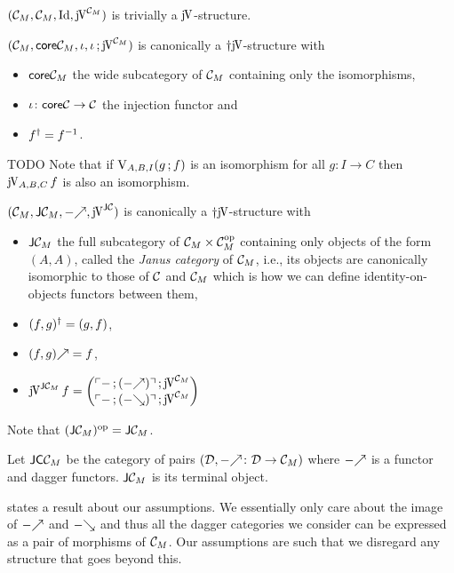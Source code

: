 \documentclass[runningheads,envcountsame]{llncs}
\newcommand{\monad}{M}
\begin{document}
\begin{example}
    $(\C_\monad, \C_\monad, \Id, \juncurry[\C_\monad])$ is trivially a $\juncurry$-structure.
\end{example}
\begin{example}
    $(\C_\monad, \coreC_\monad, \iota, \comp{\iota}{\juncurry[\C_\monad]})$ is canonically a $\dagger\juncurry$-structure with
    \begin{itemize}
        \item $\coreC_\monad$ the wide subcategory of $\C_\monad$ containing only the isomorphisms,
        \item $\iota\colon \mathsf{core}\mathcal{C} \to \mathcal{C}$ the injection functor and
        \item $\rev{f} = {f}^{-1}$.
    \end{itemize}
    TODO Note that if $\uncurry_{A, B, I} (\comp{g}{f})$ is an isomorphism for all $g\colon I \to C$ then $\juncurry_{A,B,C}\,f$ is also an isomorphism.
\end{example}
\begin{example}
    $(\C_\monad, \JC_\monad, \f{-}, \juncurry[\JC])$ is canonically a $\dagger\juncurry$-structure with
    \begin{itemize}
        \item $\JC_\monad$ the full subcategory of $\C_\monad \times \op{\C_\monad}$ containing only objects of the form $(A, A)$, called the \emph{Janus category} of $\C_\monad$, i.e., its objects are canonically isomorphic to those of $\mathcal{C}$ and $\C_\monad$ which is how we can define identity-on-objects functors between them,
        \item $\rev{(f, g)} = (g, f)$,
        \item $\f{(f, g)} = f$,
        \item $\juncurry[\JC_\monad]\,f = \janus{
            \comp{\name{\comp{-}{(\f{-})}}}{\juncurry[\C_\monad]}}{
            \comp{\name{\comp{-}{(\b{-})}}}{\juncurry[\C_\monad]}}$
    \end{itemize}
    Note that $\op{(\JC_\monad)} = \JC_\monad$.
\end{example}

\begin{lemma} \label{lem:janus-class-terminal}
    Let $\JCC_\monad$ be the category of pairs $(\D, \f{-}\colon \D \to \C_\monad)$ where $\f{-}$ is a functor and dagger functors. $\JC_\monad$ is its terminal object.
\end{lemma}

\begin{remark}
     states a result about our assumptions. We essentially only care about the image of $\f{-}$ and $\b{-}$ and thus all the dagger categories we consider can be expressed as a pair of morphisms of $\C_\monad$. Our assumptions are such that we disregard any structure that goes beyond this.
\end{remark}
\end{document}
